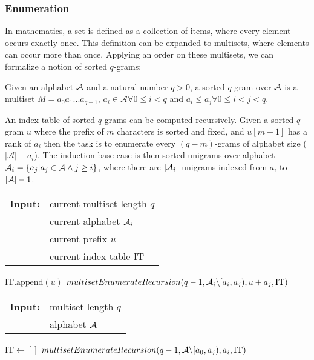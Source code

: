 \subsubsection{Enumeration}
In mathematics, a set is defined as a collection of items, where every element occurs exactly once. This definition can be expanded to multisets, where elements can occur more than once. Applying an order on these multisets, we can formalize a notion of sorted \(q\)-grams:

Given an alphabet \(\mathcal{A}\) and a natural number \(q > 0\), a sorted \(q\)-gram over \(\mathcal{A}\) is a multiset \(M=a_0a_1...a_{q-1}\), \(a_i\in\mathcal{A}\forall 0\leq i<q\) and \(a_i \leq a_j\forall 0\leq i < j < q\).

An index table of sorted \(q\)-grams can be computed recursively. Given a sorted \(q\)-gram \(u\) where the prefix of \(m\) characters is sorted and fixed, and \(u[m-1]\) has a rank of \(a_i\) then the task is to enumerate every \((q-m)\)-grams of alphabet size (\(|\mathcal{A}|-a_i\)). The induction base case is then sorted unigrams over alphabet \(\mathcal{A}_i = \{a_j| a_j\in\mathcal{A} \land j\geq i\}\), where there are \(|\mathcal{A}_i|\) unigrams indexed from \(a_i\) to \(|\mathcal{A}|-1\).

\begin{algorithm}[t]
\caption{multisetEnumerateRecursion}
\label{code:enumerateMultisetRec}
\begin{tabular}{@{}l@{~}l}
\textbf{Input:}&current multiset length \(q\)\\
               &current alphabet \(\mathcal{A}_i\)\\
               &current prefix \(u\)\\
               &current index table IT\\
\end{tabular}
\begin{algorithmic}
\State \(\text{IT.append}(u)\)
\Else
{}
\State \(multisetEnumerateRecursion(q-1,\mathcal{A}_i \backslash [a_i,a_j),u+a_j,\text{IT})\)
\EndFor
\EndIf
\end{algorithmic}
\end{algorithm}

\begin{algorithm}[t]
\caption{multisetEnumerate}
\label{code:enumerateMultiset}
\begin{tabular}{@{}l@{~}l}
\textbf{Input:}&multiset length \(q\)\\
               &alphabet \(\mathcal{A}\)
\end{tabular}
\begin{algorithmic}
\State \(\text{IT}\gets []\)
\State \(multisetEnumerateRecursion(q-1,\mathcal{A} \backslash [a_0,a_j),a_i,\text{IT})\)
\EndFor
\end{algorithmic}
\end{algorithm}

